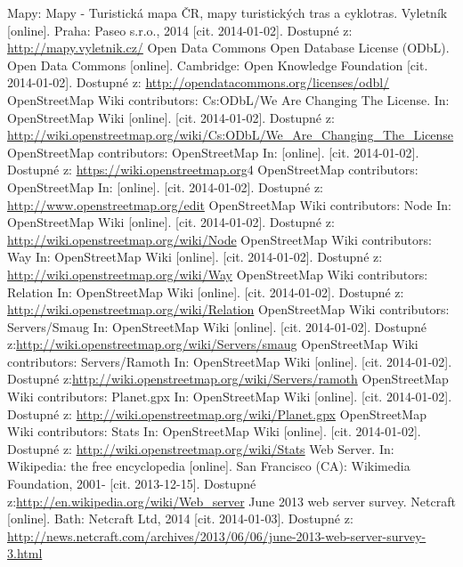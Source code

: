 \documentclass[11pt,a4paper,titlepage,oneside]{book}
\begin{document}
\begin{thebibliography}{50}
	Mapy: Mapy - Turistická mapa ČR, mapy turistických tras a cyklotras. Vyletník [online]. Praha: Paseo s.r.o., 2014 [cit. 2014-01-02]. Dostupné z: \url{http://mapy.vyletnik.cz/}
	Open Data Commons Open Database License (ODbL). Open Data Commons [online]. Cambridge: Open Knowledge Foundation [cit. 2014-01-02]. Dostupné z: \url{http://opendatacommons.org/licenses/odbl/}
	OpenStreetMap Wiki contributors: Cs:ODbL/We Are Changing The License. In: OpenStreetMap Wiki [online]. [cit. 2014-01-02]. Dostupné z: \url{http://wiki.openstreetmap.org/wiki/Cs:ODbL/We_Are_Changing_The_License}
	OpenStreetMap contributors: OpenStreetMap In:  [online]. [cit. 2014-01-02]. Dostupné z:	\url{https://wiki.openstreetmap.org}4
	OpenStreetMap contributors: OpenStreetMap In:  [online]. [cit. 2014-01-02]. Dostupné z:	\url{http://www.openstreetmap.org/edit}
	OpenStreetMap Wiki contributors: Node In: OpenStreetMap Wiki [online]. [cit. 2014-01-02]. Dostupné z: \url{http://wiki.openstreetmap.org/wiki/Node}
	OpenStreetMap Wiki contributors: Way In: OpenStreetMap Wiki [online]. [cit. 2014-01-02]. Dostupné z: \url{http://wiki.openstreetmap.org/wiki/Way}
	OpenStreetMap Wiki contributors: Relation In: OpenStreetMap Wiki [online]. [cit. 2014-01-02]. Dostupné z: \url{http://wiki.openstreetmap.org/wiki/Relation}
	OpenStreetMap Wiki contributors: Servers/Smaug In: OpenStreetMap Wiki [online]. [cit. 2014-01-02]. Dostupné z:\url{http://wiki.openstreetmap.org/wiki/Servers/smaug}
	OpenStreetMap Wiki contributors: Servers/Ramoth In: OpenStreetMap Wiki [online]. [cit. 2014-01-02]. Dostupné z:\url{http://wiki.openstreetmap.org/wiki/Servers/ramoth}
	OpenStreetMap Wiki contributors: Planet.gpx In: OpenStreetMap Wiki [online]. [cit. 2014-01-02]. Dostupné z: \url{http://wiki.openstreetmap.org/wiki/Planet.gpx}
	OpenStreetMap Wiki contributors: Stats In: OpenStreetMap Wiki [online]. [cit. 2014-01-02]. Dostupné z: \url{http://wiki.openstreetmap.org/wiki/Stats}
	Web Server. In: Wikipedia: the free encyclopedia [online]. San Francisco (CA): Wikimedia Foundation, 2001- [cit. 2013-12-15]. Dostupné z:\url{http://en.wikipedia.org/wiki/Web_server}
	June 2013 web server survey. Netcraft [online]. Bath: Netcraft Ltd, 2014 [cit. 2014-01-03]. Dostupné z: \url{http://news.netcraft.com/archives/2013/06/06/june-2013-web-server-survey-3.html}

\end{thebibliography}
\end{document}
